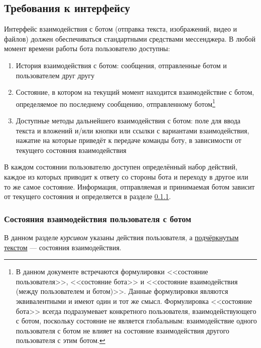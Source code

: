 \subsection{Требования к интерфейсу}
\label{sec:req:ui}
Интерфейс взаимодействия с ботом (отправка текста, изображений, видео и файлов)
должен обеспечиваться стандартными средствами мессенджера. В любой момент времени работы
бота пользователю доступны:
\begin{enumerate}
    \item
        История взаимодействия с ботом: сообщения, отправленные ботом и пользователем
        друг другу
    \item
        Состояние, в котором на текущий момент находится взаимодействие с ботом, определяемое
        по последнему сообщению, отправленному ботом\footnote{В данном документе встречаются формулировки
        <<состояние пользователя>>, <<состояние бота>> и <<состояние взаимодействия
        (между пользователем и ботом)>>. Данные формулировки являются эквивалентными и имеют
        один и тот же смысл. Формулировка <<состояние бота>> всегда подразумевает конкретного пользователя,
        взаимодействующего с ботом, поскольку состояние не является глобальным: взаимодействие одного
        пользователя с ботом не влияет на состояние взаимодействия другого пользователя с этим ботом.}
    \item
        Доступные методы дальнейшего взаимодействия с ботом: поле для ввода текста и вложений
        и/или кнопки или ссылки с вариантами взаимодействия, нажатие на которые приведёт к передаче
        команды боту, в зависимости от текущего состояния взаимодействия
\end{enumerate}
В каждом состоянии пользователю доступен определённый набор действий, каждое из которых
приводит к ответу со стороны бота и переходу в другое или то же самое состояние.
Информация, отправляемая и принимаемая ботом зависит от текущего состояния и определяется в разделе
\ref{sec:req:ui:states}.

\subsubsection{Состояния взаимодействия пользователя с ботом}
    \label{sec:req:ui:states}
    \begingroup
    \newcommand{\action}[1]{\textit{#1}}%
    \newcommand{\state}[1]{\uline{#1}}%
    В данном разделе \action{курсивом} указаны действия пользователя, а \state{подчёркнутым текстом}
    --- состояния взаимодействия.

